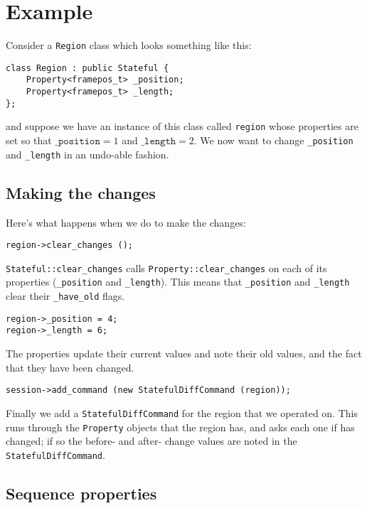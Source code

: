 \documentclass[10pt,a4paper]{book}
\newcommand{\code}[1]{\texttt{#1}}
\begin{document}
\section{Example}

Consider a \code{Region} class which looks something like this:

\begin{lstlisting}
class Region : public Stateful {
    Property<framepos_t> _position;
    Property<framepos_t> _length;
};
\end{lstlisting}

and suppose we have an instance of this class called \code{region}
whose properties are set so that $\code{\_position} = 1$ and
$\code{\_length} = 2$.  We now want to change \code{\_position} and
\code{\_length} in an undo-able fashion.

\subsection{Making the changes}

Here's what happens when we do to make the changes:

\begin{lstlisting}
region->clear_changes ();
\end{lstlisting}

\code{Stateful::clear\_changes} calls \code{Property::clear\_changes}
on each of its properties (\code{\_position} and \code{\_length}).
This means that \code{\_position} and \code{\_length} clear their
\code{\_have\_old} flags.

\begin{lstlisting}
region->_position = 4;
region->_length = 6;
\end{lstlisting}

The properties update their current values and note their old values,
and the fact that they have been changed.

\begin{lstlisting}
session->add_command (new StatefulDiffCommand (region));
\end{lstlisting}

Finally we add a \code{StatefulDiffCommand} for the region that we
operated on.  This runs through the \code{Property} objects that the
region has, and asks each one if has changed; if so the before- and
after- change values are noted in the \code{StatefulDiffCommand}.


\subsection{Sequence properties}
\end{document}

